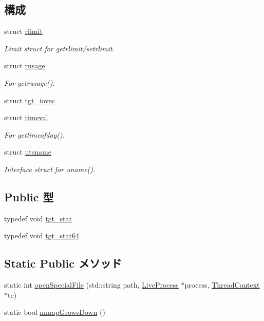 \subsection*{構成}
\begin{DoxyCompactItemize}
\item 
struct \hyperlink{structOperatingSystem_1_1rlimit}{rlimit}
\begin{DoxyCompactList}\small\item\em Limit struct for getrlimit/setrlimit. \item\end{DoxyCompactList}\item 
struct \hyperlink{structOperatingSystem_1_1rusage}{rusage}
\begin{DoxyCompactList}\small\item\em For getrusage(). \item\end{DoxyCompactList}\item 
struct \hyperlink{structOperatingSystem_1_1tgt__iovec}{tgt\_\-iovec}
\item 
struct \hyperlink{structOperatingSystem_1_1timeval}{timeval}
\begin{DoxyCompactList}\small\item\em For gettimeofday(). \item\end{DoxyCompactList}\item 
struct \hyperlink{structOperatingSystem_1_1utsname}{utsname}
\begin{DoxyCompactList}\small\item\em Interface struct for uname(). \item\end{DoxyCompactList}\end{DoxyCompactItemize}
\subsection*{Public 型}
\begin{DoxyCompactItemize}
\item 
typedef void \hyperlink{classOperatingSystem_a2b1f8be68cdf9781efbaf6e9cdbd8d02}{tgt\_\-stat}
\item 
typedef void \hyperlink{classOperatingSystem_af8d98b8c56085b677de8e0c66eed9d6b}{tgt\_\-stat64}
\end{DoxyCompactItemize}
\subsection*{Static Public メソッド}
\begin{DoxyCompactItemize}
\item 
static int \hyperlink{classOperatingSystem_a4d991052a0ab25e074acd669d8570c30}{openSpecialFile} (std::string path, \hyperlink{classLiveProcess}{LiveProcess} $\ast$process, \hyperlink{classThreadContext}{ThreadContext} $\ast$tc)
\item 
static bool \hyperlink{classOperatingSystem_ac6a940551fe72dce1ba4e7b4fa093137}{mmapGrowsDown} ()
\end{DoxyCompactItemize}
